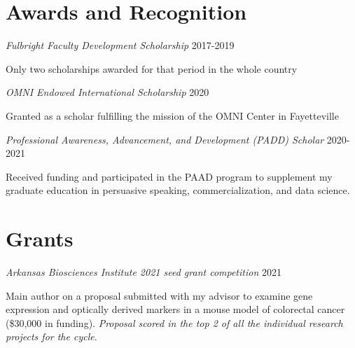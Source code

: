 \documentclass[10pt,]{article}
\begin{document}
\hypertarget{awards-and-recognition}{%
\section{Awards and Recognition}\label{awards-and-recognition}}

\emph{Fulbright Faculty Development Scholarship} \hfill 2017-2019

Only two scholarships awarded for that period in the whole country

\emph{OMNI Endowed International Scholarship} \hfill 2020

Granted as a scholar fulfilling the mission of the OMNI Center in
Fayetteville

\emph{Professional Awareness, Advancement, and Development (PADD)
Scholar} \hfill 2020-2021

Received funding and participated in the PAAD program to supplement my
graduate education in persuasive speaking, commercialization, and data
science.

\hypertarget{grants}{%
\section{Grants}\label{grants}}

\emph{Arkansas Biosciences Institute 2021 seed grant competition }
\hfill 2021

Main author on a proposal submitted with my advisor to examine gene
expression and optically derived markers in a mouse model of colorectal
cancer (\$30,000 in funding). \emph{Proposal scored in the top 2 of all
the individual research projects for the cycle}.
\end{document}
